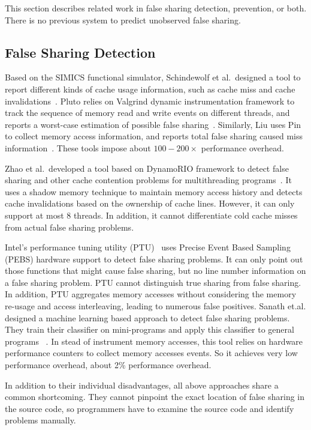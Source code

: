 \label{sec:relatedwork}

This section describes related work in false sharing detection, prevention, or both. There is no previous
system to predict unobserved false sharing.

\subsection{False Sharing Detection}
Based on the SIMICS functional simulator, Schindewolf et al.\ designed a tool to report different kinds of cache usage information, such as cache miss and cache invalidations~\cite{falseshare:simulator}. Pluto relies on Valgrind dynamic instrumentation framework to track the sequence of memory read and write events on different threads, and reports a worst-case estimation of possible false sharing~\cite{falseshare:binaryinstrumentation1}.
Similarly, Liu uses Pin to collect memory access information, and reports total false sharing caused miss information~\cite{falseshare:binaryinstrumentation2}.
These tools impose about $100-200\times$ performance overhead.

Zhao et al.\ developed a tool based on DynamoRIO framework to detect false sharing and other cache contention problems
for multithreading programs~\cite{qinzhaodetection}. 
It uses a shadow memory technique to maintain memory access history and detects cache invalidations based on the ownership of cache lines. However, it can only support at most $8$ threads. In addition, it cannot differentiate cold cache misses from actual false sharing problems.

Intel's performance tuning utility (PTU)~\cite{detect:ptu, detect:intel} uses Precise Event Based Sampling (PEBS) hardware support to detect false sharing problems.  It can only point out those functions that might cause false sharing, but no line number information on a false sharing problem.  PTU cannot distinguish true sharing from false sharing. In addition, PTU aggregates memory accesses without considering the memory re-usage and access interleaving, leading to numerous false positives. Sanath et.al. designed a machine learning based approach to detect false sharing problems. They train their classifier on mini-programs and apply this classifier to general programs ~\cite{mldetect}. 
In stead of instrument memory accesses, this tool relies on hardware performance counters to collect memory accesses events. So it achieves very low performance overhead, about 2\% performance overhead. 

In addition to their individual disadvantages,
all above approaches share a common shortcoming. 
They cannot pinpoint the exact location of false sharing in the source code, so programmers have to examine the source code and identify problems manually.

